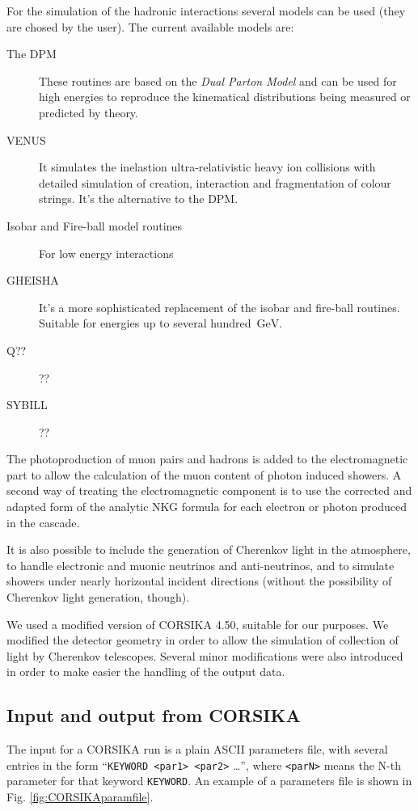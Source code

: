 \documentclass[12pt]{article}
\renewcommand{\u}[1]{\ensuremath{\mathrm{\,#1}}}
\def\CORSIKA{\textsf{CORSIKA}\xspace}
\def\cerenkov{Cherenkov\xspace}             %
\def\Cherenkov{\cerenkov}                   %
\begin{document}
For the simulation of the hadronic interactions several models can be
used (they are chosed by the user). The current available models are:

\begin{description}
  
\item[The DPM] These routines are based on the \emph{Dual Parton Model}
  and can be used for high energies to reproduce the kinematical
  distributions being measured or predicted by theory.
  
\item[VENUS] It simulates the inelastion ultra-relativistic heavy ion
  collisions with detailed simulation of creation, interaction and
  fragmentation of colour strings. It's the alternative to the DPM.
  
\item[Isobar and Fire-ball model routines] For low energy interactions
  
\item[GHEISHA] It's a more sophisticated replacement of the isobar and
  fire-ball routines. Suitable for energies up to several hundred
  \u{GeV}.

\item[Q??]      ??

\item[SYBILL] ??

\end{description}

The photoproduction of muon pairs and hadrons is added to the
electromagnetic part to allow the calculation of the muon content of
photon induced showers. A second way of treating the electromagnetic
component is to use the corrected and adapted form of the analytic NKG
formula for each electron or photon produced in the cascade.

It is also possible to include the generation of \Cherenkov light in
the atmosphere, to handle electronic and muonic neutrinos and
anti-neutrinos, and to simulate showers under nearly horizontal
incident directions (without the possibility of \Cherenkov light
generation, though).

We used a modified version of \CORSIKA 4.50, suitable for our purposes.
We modified the detector geometry in order to allow the simulation of
collection of light by \Cherenkov telescopes. Several minor
modifications were also introduced in order to make easier the
handling of the output data.

\subsection{Input and output from \CORSIKA}
%
The input for a \CORSIKA run is a plain ASCII parameters file, with
several entries in the form ``\texttt{KEYWORD <par1> <par2>} \ldots'',
where \texttt{<parN>} means the N-th parameter for that keyword
\texttt{KEYWORD}. An example of a parameters file is shown in Fig.
\ref{fig:CORSIKAparamfile}.
\end{document}
